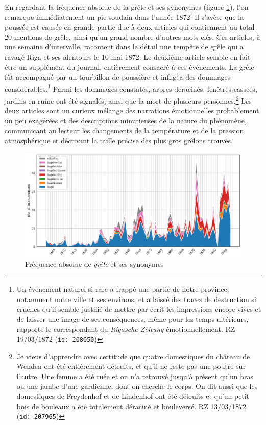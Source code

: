 \documentclass[a4paper,twoside,12pt]{article}
\begin{document}
En regardant la fréquence absolue de la grêle et ses synonymes (figure \ref{fig:hagel}), l'on remarque immédiatement un pic soudain dans l'année 1872. Il s'avère que la poussée est causée en grande partie due à deux articles qui contiennent au total 20 mentions de grêle, ainsi qu'un grand nombre d'autres mots-clés. Ces articles, à une semaine d'intervalle, racontent dans le détail une tempête de grêle qui a ravagé Riga et ses alentours le 10 mai 1872. Le deuxième article semble en fait être un supplément du journal, entièrement consacré à ces événements. La grêle fût accompagné par un tourbillon de poussière et infligea des dommages considérables.\footnote{\og Un événement naturel si rare a frappé une partie de notre province, notamment notre ville et ses environs, et a laissé des traces de destruction si cruelles qu'il semble justifié de mettre par écrit les impressions encore vives et de laisser une image de ses conséquences, même pour les temps ultérieurs, \fg{} rapporte le correspondant du \textit{Rigasche Zeitung} émotionnellement. RZ 19/03/1872 (\texttt{id: 208050})} Parmi les dommages constatés, arbres déracinés, fenêtres cassées, jardins en ruine ont été signalés, ainsi que la mort de plusieurs personnes.\footnote{\og Je viens d'apprendre avec certitude que quatre domestiques du château de Wenden ont été entièrement détruits, et qu'il ne reste pas une poutre sur l'autre. Une femme a été tuée et on n'a retrouvé jusqu'à présent qu'un bras ou une jambe d'une gardienne, dont on cherche le corps. On dit aussi que les domestiques de Freydenhof et de Lindenhof ont été détruits et qu'un petit bois de bouleaux a été totalement déraciné et bouleversé. \fg{} RZ 13/03/1872 (\texttt{id: 207965})} Les deux articles sont un curieux mélange des narrations émotionnelles probablement un peu exagérées et des descriptions minutieuses de la nature du phénomène, communicant au lecteur les changements de la température et de la pression atmosphérique et décrivant la taille précise des plus gros grêlons trouvés.

\begin{figure}[h]
    \centering
    \includegraphics[width=\textwidth]{images/hagel.pdf}
    \caption{Fréquence absolue de \textit{grêle} et ses synonymes}
    \label{fig:hagel}
\end{figure}
\end{document}
